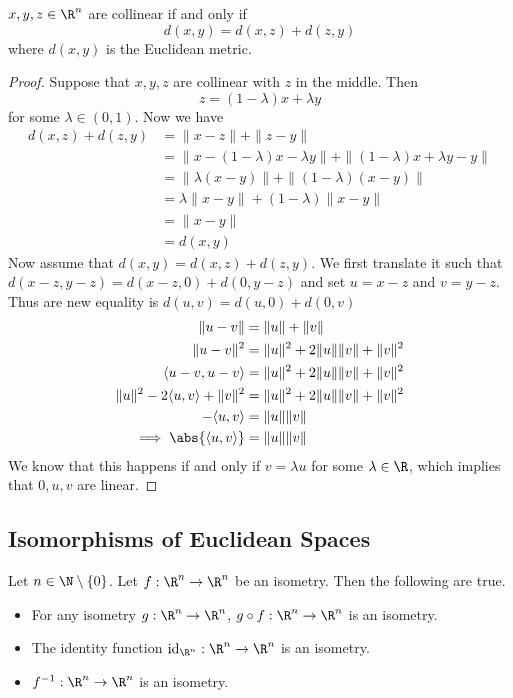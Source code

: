 \documentclass[a4paper]{article}
\begin{document}
\begin{prp}{}{} $x,y,z\in\R^n$ are collinear if and only if $$d(x,y)=d(x,z)+d(z,y)$$ where $d(x,y)$ is the Euclidean metric. \tcbline
\begin{proof} Suppose that $x,y,z$ are collinear with $z$ in the middle. Then $$z=(1-\lambda)x+\lambda y$$ for some $\lambda\in(0,1)$. Now we have 
\begin{align*}
d(x,z)+d(z,y)&=\|x-z\|+\|z-y\|\\
&=\|x-(1-\lambda)x-\lambda y\|+\|(1-\lambda)x+\lambda y-y\|\\
&=\|\lambda(x-y)\|+\|(1-\lambda)(x-y)\|\\
&=\lambda\|x-y\|+(1-\lambda)\|x-y\|\\
&=\|x-y\|\\
&=d(x,y)
\end{align*}
Now assume that $d(x,y)=d(x,z)+d(z,y)$. We first translate it such that $d(x-z,y-z)=d(x-z,0)+d(0,y-z)$ and set $u=x-z$ and $v=y-z$. Thus are new equality is $d(u,v)=d(u,0)+d(0,v)$
\begin{align*}
\|u-v\|&=\|u\|+\|v\|\\
\|u-v\|^2&=\|u\|^2+2\|u\|\|v\|+\|v\|^2\\
\langle u-v,u-v\rangle&=\|u\|^2+2\|u\|\|v\|+\|v\|^2\\
\|u\|^2-2\langle u,v\rangle+\|v\|^2&=\|u\|^2+2\|u\|\|v\|+\|v\|^2\\
-\langle u,v\rangle&=\|u\|\|v\|\\
\implies\abs{\langle u,v\rangle}&=\|u\|\|v\|\\
\end{align*}
We know that this happens if and only if $v=\lambda u$ for some $\lambda\in\R$, which implies that $0,u,v$ are linear. 
\end{proof}
\end{prp}

\subsection{Isomorphisms of Euclidean Spaces}
\begin{prp}{}{} Let $n\in\N\setminus\{0\}$. Let $f:\R^n\to\R^n$ be an isometry. Then the following are true. 
\begin{itemize}
\item For any isometry $g:\R^n\to\R^n$, $g\circ f:\R^n\to\R^n$ is an isometry. 
\item The identity function $\text{id}_{\R^n}:\R^n\to\R^n$ is an isometry. 
\item $f^{-1}:\R^n\to\R^n$ is an isometry. 
\end{itemize}
\end{prp}
\end{document}
